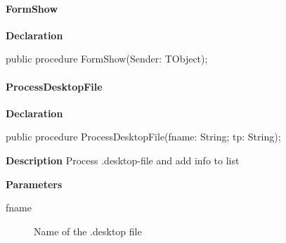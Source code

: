 \documentclass{report}
\newif\ifpdf
\begin{document}
\paragraph*{FormShow}\hspace*{\fill}

\label{manager.TMnFrm-FormShow}
\begin{list}{}{
\setlength{\itemindent}{0cm}
\setlength{\listparindent}{0cm}
\setlength{\leftmargin}{\evensidemargin}
\addtolength{\leftmargin}{\tmplength}
\settowidth{\labelsep}{X}
\addtolength{\leftmargin}{\labelsep}
\setlength{\labelwidth}{\tmplength}
}
\item[\textbf{Declaration}\hfill]
\ifpdf
\begin{flushleft}
\fi
\begin{ttfamily}
public procedure FormShow(Sender: TObject);\end{ttfamily}

\ifpdf
\end{flushleft}
\fi

\end{list}
\paragraph*{ProcessDesktopFile}\hspace*{\fill}

\label{manager.TMnFrm-ProcessDesktopFile}
\begin{list}{}{
\setlength{\itemindent}{0cm}
\setlength{\listparindent}{0cm}
\setlength{\leftmargin}{\evensidemargin}
\addtolength{\leftmargin}{\tmplength}
\settowidth{\labelsep}{X}
\addtolength{\leftmargin}{\labelsep}
\setlength{\labelwidth}{\tmplength}
}
\item[\textbf{Declaration}\hfill]
\ifpdf
\begin{flushleft}
\fi
\begin{ttfamily}
public procedure ProcessDesktopFile(fname: String; tp: String);\end{ttfamily}

\ifpdf
\end{flushleft}
\fi

\par
\item[\textbf{Description}]
Process .desktop{-}file and add info to list \par
\item[\textbf{Parameters}]
\begin{description}
\item[fname] Name of the .desktop file
\end{description}


\end{list}
\end{document}
